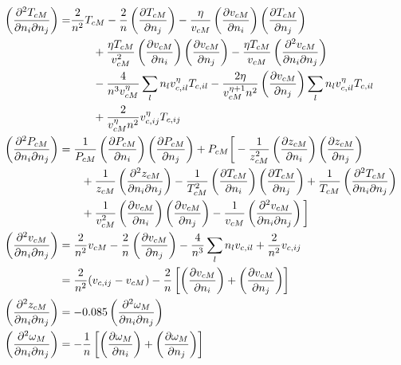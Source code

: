 \documentclass[english]{../thermomemo/thermomemo}
\numberwithin{equation}{section}
\newcommand*{\pder}[2]{\left(\frac{\partial #1}{\partial #2}\right)}
\newcommand*{\pdcross}[3]{\left(\frac{\partial^2 #1}{\partial #2 \partial #3}\right)}
\begin{document}
\begin{align}
  \phantom{\pdcross{T_{cM}}{n_i}{n_j}}
  \label{eq:TcM_ij}
  & \begin{aligned}
    \mathllap{\pdcross{T_{cM}}{n_i}{n_j}} = 
    & \frac{2}{n^2} T_{cM} - \frac{2}{n} \pder{T_{cM}}{n_j} - \frac{\eta}{v_{cM}} \pder{v_{cM}}{n_{i}} \pder{T_{cM}}{n_j} \\
    & \qquad + \frac{\eta T_{cM}}{v_{cM}^2} \pder{v_{cM}}{n_i} \pder{v_{cM}}{n_j} - \frac{\eta T_{cM}}{v_{cM}} \pdcross{v_{cM}}{n_i}{n_j} \\
    & \qquad - \frac{4}{n^3 v_{cM}^\eta} \sum_l n_l v_{c,il}^\eta T_{c,il} - \frac{2 \eta}{v_{cM}^{\eta + 1} n^2} \pder{v_{cM}}{n_j} \sum_l n_l v_{c,il}^\eta T_{c,il} \\
    & \qquad + \frac{2}{v_{cM}^\eta n^2} v_{c,ij}^\eta T_{c,ij}
  \end{aligned} \\
  \label{eq:PcM_ij}
  & \begin{aligned}
    \mathllap{\pdcross{P_{cM}}{n_i}{n_j}}
    & =  \frac{1}{P_{cM}} \pder{P_{cM}}{n_i} \pder{P_{cM}}{n_j} + P_{cM} \bigg[ -\frac{1}{z_{cM}^2} \pder{z_{cM}}{n_i} \pder{z_{cM}}{n_j} \\
    & \qquad + \frac{1}{z_{cM}} \pdcross{z_{cM}}{n_i}{n_j} - \frac{1}{T_{cM}^2}\pder{T_{cM}}{n_i}\pder{T_{cM}}{n_j} + \frac{1}{T_{cM}} \pdcross{T_{cM}}{n_i}{n_j} \\
    & \qquad + \frac{1}{v_{cM}^2}\pder{v_{cM}}{n_i}\pder{v_{cM}}{n_j} - \frac{1}{v_{cM}} \pdcross{v_{cM}}{n_i}{n_j} \bigg] 
  \end{aligned} \\
  \label{eq:vcM_ij}
  & \begin{aligned}
    \mathllap{\pdcross{v_{cM}}{n_i}{n_j}}
    & = \frac{2}{n^2} v_{cM} - \frac{2}{n} \pder{v_{cM}}{n_j} - \frac{4}{n^3}\sum_l n_l v_{c,il} + \frac{2}{n^2} v_{c,ij}   \\
    & = \frac{2}{n^2} (v_{c,ij} - v_{cM}) - \frac{2}{n}\left[\pder{v_{cM}}{n_i} + \pder{v_{cM}}{n_j}\right]
  \end{aligned} \\
  \label{eq:zcM_ij}
  & \begin{aligned}
    \mathllap{\pdcross{z_{cM}}{n_i}{n_j}} & = -0.085 \pdcross{\omega_{M}}{n_i}{n_j} 
  \end{aligned} \\
  \label{eq:wM_ij}
  & \begin{aligned}
    \mathllap{\pdcross{\omega_{M}}{n_i}{n_j}} & = -\frac{1}{n} \left[\pder{\omega_M}{n_i} + \pder{\omega_M}{n_j} \right]
  \end{aligned} 
\end{align}
\end{document}
